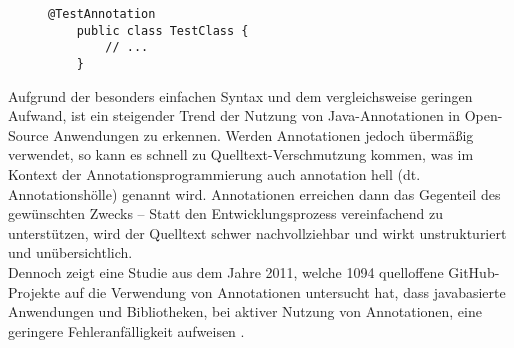 \begin{figure}[H]
	\centering
	\begin{lstlisting}[caption={Beispiel einer annotierten Klasse.}, captionpos=b, label=lst:annotated_example]
	@TestAnnotation
	public class TestClass {
	    // ...
	}
	\end{lstlisting}
\end{figure}
\noindent Aufgrund der besonders einfachen Syntax und dem vergleichsweise geringen Aufwand, ist ein steigender Trend der Nutzung von Java-Annotationen in Open-Source Anwendungen zu erkennen. Werden Annotationen jedoch übermäßig verwendet, so kann es schnell zu Quelltext-Verschmutzung kommen, was im Kontext der Annotationsprogrammierung auch \glqq annotation hell\grqq{} (dt. Annotationshölle) genannt wird. Annotationen erreichen dann das Gegenteil des gewünschten Zwecks -- Statt den Entwicklungsprozess vereinfachend zu unterstützen, wird der Quelltext schwer nachvollziehbar und wirkt unstrukturiert und unübersichtlich.\\
Dennoch zeigt eine Studie aus dem Jahre 2011, welche 1094 quelloffene GitHub-Projekte auf die Verwendung von Annotationen untersucht hat, dass javabasierte Anwendungen und Bibliotheken, bei aktiver Nutzung von Annotationen, eine geringere Fehleranfälligkeit aufweisen \cite{Rocha2011}.
